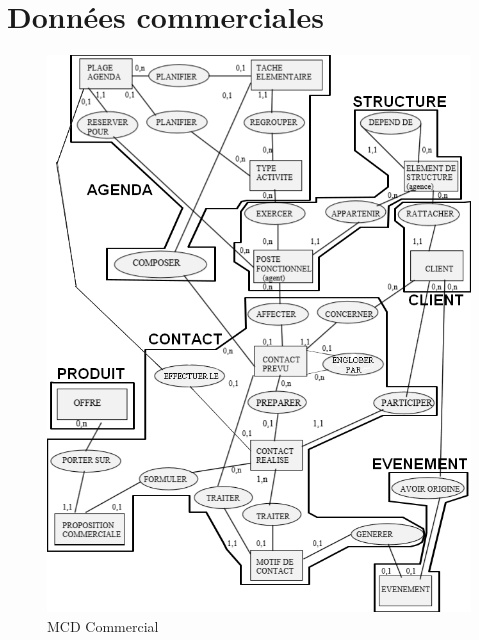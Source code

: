 \section{Données commerciales}
\begin{figure}[H]
\centering
\includegraphics[width=\textwidth]{figures/mcd/MCD_Commercial}
\caption{MCD Commercial}
\end{figure}
